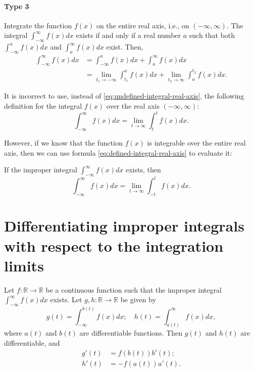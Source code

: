 \paragraph{Type 3}
Integrate the function $ f(x) $ on the entire real axis, i.e., on
    $ (-\infty, \infty) $.
The integral $ \int_{-\infty}^{\infty} f(x) dx $ exists if and only if a real
    number $ a $ such that both $ \int_{-\infty}^{a} f(x) dx $ and
    $ \int_{a}^{\infty} f(x) dx $ exist.
Then,
\begin{align}
    \int_{-\infty}^{\infty} f(x) dx
        &= \int_{-\infty}^{a} f(x) dx + \int_{a}^{\infty} f(x) dx \\
        &= \lim_{t_1 \rightarrow -\infty} \int_{t_1}^{a} f(x) dx +
            \lim_{t_2 \rightarrow \infty} \int_{a}^{t_2} f(x) dx.
            \label{eq:undefined-integral-real-axis}
\end{align}

It is incorrect to use, instead of \eqref{eq:undefined-integral-real-axis}, the
    following definition for the integral $ f(x) $ over the real axis
    $ (-\infty, \infty) $:
\begin{equation}
    \int_{-\infty}^{\infty} f(x) dx = \lim_{t \rightarrow \infty}
        \int_{t}^{t} f(x) dx.
    \label{eq:defined-integral-real-axis}
\end{equation}

However, if we know that the function $ f(x) $ is integrable over the entire
    real axis, then we can use formula \eqref{eq:defined-integral-real-axis} to
    evaluate it:
\begin{lemma}
    If the improper integral $ \int_{-\infty}^{\infty} f(x) dx $ exists, then
    \begin{equation}
        \int_{-\infty}^{\infty} f(x) dx = \lim_{t \rightarrow \infty}
            \int_{-t}^{t} f(x) dx.
        \label{eq:lemma:defined-integral-real-axis}
    \end{equation}
\end{lemma}

\section{Differentiating improper integrals with respect to the integration
    limits}
\begin{lemma}
    Let $ f : \mathbb{R} \rightarrow \mathbb{R} $ be a continuous function such
        that the improper integral $ \int_{-\infty}^{\infty} f(x) dx $ exists.
    Let $ g, h : \mathbb{R} \rightarrow \mathbb{R} $ be given by
    \begin{equation*}
        g(t) = \int_{-\infty}^{b(t)} f(x) dx; \quad
        h(t) = \int_{a(t)}^{\infty} f(x) dx,
    \end{equation*}
    where $ a(t) $ and $ b(t) $ are differentiable functions.
    Then $ g(t) $ and $ h(t) $ are differentiable, and
    \begin{align*}
        g'(t) &= f(b(t)) b'(t); \\
        h'(t) &= -f(a(t)) a'(t).
    \end{align*}
\end{lemma}

